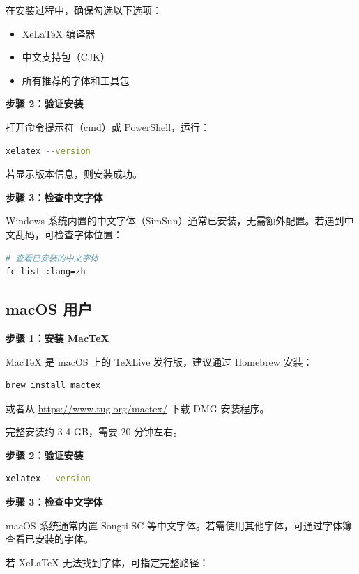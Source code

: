 在安装过程中，确保勾选以下选项：

\begin{itemize}
    \item XeLaTeX 编译器
    \item 中文支持包（CJK）
    \item 所有推荐的字体和工具包
\end{itemize}

\textbf{步骤 2：验证安装}

打开命令提示符（cmd）或 PowerShell，运行：

\begin{lstlisting}[style=blockstyle,language=bash]
xelatex --version
\end{lstlisting}

若显示版本信息，则安装成功。

\textbf{步骤 3：检查中文字体}

Windows 系统内置的中文字体（SimSun）通常已安装，无需额外配置。若遇到中文乱码，可检查字体位置：

\begin{lstlisting}[style=blockstyle,language=bash]
# 查看已安装的中文字体
fc-list :lang=zh
\end{lstlisting}

\subsection{macOS 用户}

\textbf{步骤 1：安装 MacTeX}

MacTeX 是 macOS 上的 TeXLive 发行版，建议通过 Homebrew 安装：

\begin{lstlisting}[style=blockstyle,language=bash]
brew install mactex
\end{lstlisting}

或者从 \url{https://www.tug.org/mactex/} 下载 DMG 安装程序。

完整安装约 3-4 GB，需要 20 分钟左右。

\textbf{步骤 2：验证安装}

\begin{lstlisting}[style=blockstyle,language=bash]
xelatex --version
\end{lstlisting}

\textbf{步骤 3：检查中文字体}

macOS 系统通常内置 Songti SC 等中文字体。若需使用其他字体，可通过字体簿查看已安装的字体。

若 XeLaTeX 无法找到字体，可指定完整路径：

